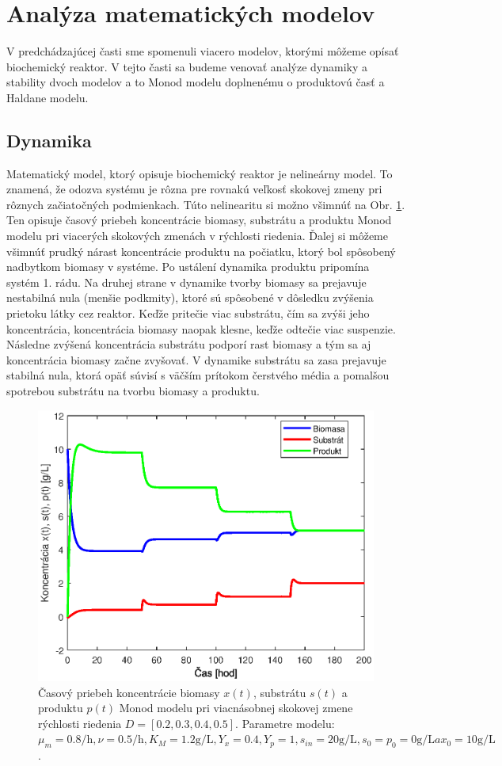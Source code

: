 \section{Analýza matematických modelov}
V predchádzajúcej časti sme spomenuli viacero modelov, ktorými môžeme opísať biochemický reaktor. V tejto časti sa budeme venovať analýze dynamiky a stability dvoch modelov a to Monod modelu doplnenému o produktovú časť a Haldane modelu.

\subsection{Dynamika}
Matematický model, ktorý opisuje biochemický reaktor je nelineárny model. To znamená, že odozva systému je rôzna pre rovnakú veľkosť skokovej zmeny pri rôznych začiatočných podmienkach. Túto nelinearitu si možno všimnúť na Obr. \ref{fig:dyn_monod_ex}. Ten opisuje časový priebeh koncentrácie biomasy, substrátu a produktu Monod modelu pri viacerých skokových zmenách v rýchlosti riedenia. Ďalej si môžeme všimnúť prudký nárast koncentrácie produktu na počiatku, ktorý bol spôsobený nadbytkom biomasy v systéme. Po ustálení dynamika produktu pripomína systém 1. rádu. Na druhej strane v dynamike tvorby biomasy sa prejavuje nestabilná nula (menšie podkmity), ktoré sú spôsobené v dôsledku zvýšenia prietoku látky cez reaktor. Keďže pritečie viac substrátu, čím sa zvýši jeho koncentrácia, koncentrácia biomasy naopak klesne, keďže odtečie viac suspenzie. Následne zvýšená koncentrácia substrátu podporí rast biomasy a tým sa aj koncentrácia biomasy začne zvyšovať. V dynamike substrátu sa zasa prejavuje stabilná nula, ktorá opäť súvisí s väčším prítokom čerstvého média a pomalšou spotrebou substrátu na tvorbu biomasy a produktu.
\begin{figure}
	\centering
	\includegraphics[width=0.7\linewidth]{images/monod_data}
	\caption{Časový priebeh koncentrácie biomasy $ x(t) $, substrátu $ s(t) $ a produktu $ p(t) $ Monod modelu pri viacnásobnej skokovej zmene rýchlosti riedenia $ D = [0.2, 0.3, 0.4, 0.5] $. Parametre modelu: $ \mu_{m} = 0.8\si{\per\hour}, \nu = 0.5\si{\per\hour}, K_{M} = 1.2\si{\gram\per\liter}, Y_{x} = 0.4, Y_{p} = 1, s_{in} = 20\si{\gram\per\liter}, s_0 = p_0 = 0\si{\gram\per\liter} a x_0 = 10\si{\gram\per\liter}$.}
	\label{fig:dyn_monod_ex}
\end{figure}

